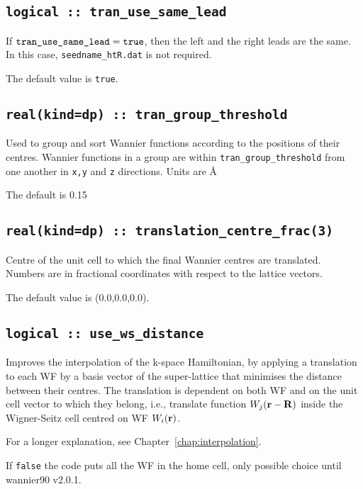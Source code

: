\subsection[tran\_use\_same\_lead]{\tt logical :: tran\_use\_same\_lead}

If $\verb#tran_use_same_lead#=\verb#true#$, then the
left and the right leads are the same. In this case, 
\verb#seedname_htR.dat# is not required.

The default value is {\tt true}.

\subsection[tran\_group\_threshold]{\tt real(kind=dp) :: tran\_group\_threshold}

Used to group and sort Wannier functions according to the positions of their centres.
Wannier functions in a group are within \verb#tran_group_threshold#
from one another in \verb#x,y# and \verb#z# directions. Units are \AA

The default is 0.15

\subsection[translation\_centre\_frac]{\tt real(kind=dp) :: translation\_centre\_frac(3)}

Centre of the unit cell to which the final Wannier centres are
translated. Numbers are in fractional coordinates with respect to the
lattice vectors.
 
The default value is (0.0,0.0,0.0).

\subsection[use\_ws\_distance]{\tt logical :: use\_ws\_distance}

Improves the interpolation of the k-space Hamiltonian, by
applying a translation to each WF by a basis
vector of the super-lattice that minimises the distance between their centres.
The translation is dependent on both WF and on the unit cell vector
to which they belong, i.e., translate function $W_j({\bf r}-{\bf R})$ inside
the Wigner-Seitz cell centred on WF $W_i({\bf r})$.

For a longer explanation, see Chapter~\ref{chap:interpolation}.

If {\tt false} the code puts all the WF in the home cell, only possible choice until wannier90 v2.0.1.

